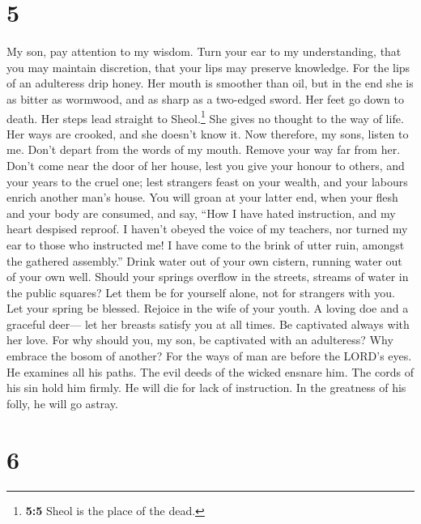 \hypertarget{section-4}{%
\section{5}\label{section-4}}

 My son, pay attention to my wisdom. Turn your ear to my
understanding,  that you may maintain discretion, that
your lips may preserve knowledge.  For the lips of an
adulteress drip honey. Her mouth is smoother than oil, 
but in the end she is as bitter as wormwood, and as sharp as a two-edged
sword.  Her feet go down to death. Her steps lead straight
to Sheol.\footnote{\textbf{5:5} Sheol is the place of the dead.}
 She gives no thought to the way of life. Her ways are
crooked, and she doesn't know it.  Now therefore, my sons,
listen to me. Don't depart from the words of my mouth. 
Remove your way far from her. Don't come near the door of her house,
 lest you give your honour to others, and your years to
the cruel one;  lest strangers feast on your wealth, and
your labours enrich another man's house.  You will groan
at your latter end, when your flesh and your body are consumed,
 and say, ``How I have hated instruction, and my heart
despised reproof.  I haven't obeyed the voice of my
teachers, nor turned my ear to those who instructed me! 
I have come to the brink of utter ruin, amongst the gathered assembly.''
 Drink water out of your own cistern, running water out
of your own well.  Should your springs overflow in the
streets, streams of water in the public squares?  Let
them be for yourself alone, not for strangers with you. 
Let your spring be blessed. Rejoice in the wife of your youth.
 A loving doe and a graceful deer--- let her breasts
satisfy you at all times. Be captivated always with her love.
 For why should you, my son, be captivated with an
adulteress? Why embrace the bosom of another?  For the
ways of man are before the LORD's eyes. He examines all his paths.
 The evil deeds of the wicked ensnare him. The cords of
his sin hold him firmly.  He will die for lack of
instruction. In the greatness of his folly, he will go astray.

\hypertarget{section-5}{%
\section{6}\label{section-5}}

